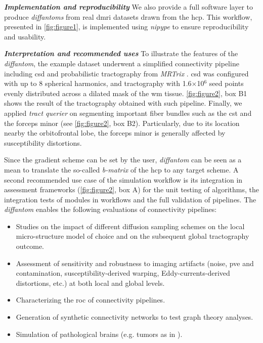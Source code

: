 \documentclass[english]{frontiers/frontiersSCNS} %
\newcommand*\glslines[2][]{\glslink[#1]{#2}{\glsdisp{#2}{\acrlong{#2} --\glsentryshort{#2}--}}}
\begin{document}
\noindent\textbf{\textit{Implementation and reproducibility\textcolon}\label{sec:data_workflow}} %
We also provide a full software layer to produce \emph{diffantoms} from real \gls*{dmri} datasets
  drawn from the \gls*{hcp}.
This workflow, presented in \autoref{fig:figure1}, is implemented using
  \emph{nipype} \citep{gorgolewski_nipype_2011} to ensure reproducibility and usability.

\noindent\textbf{\textit{Interpretation and recommended uses\textcolon}\label{sec:data_use}} %
To illustrate the features of the \emph{diffantom}, the example dataset underwent a simplified
  connectivity pipeline including \gls*{csd} and probabilistic tractography from
  \emph{MRTrix} \citep{tournier_mrtrix_2012}.
\Gls*{csd} was configured with up to 8 spherical harmonics, and tractography with 1.6$\times$10$^\text{6}$
  seed points evenly distributed across a dilated mask of the \gls*{wm} tissue.
\autoref{fig:figure2}, box B1 shows the result of the tractography obtained with such pipeline.
Finally, we applied \emph{tract querier} \citep{wassermann_on_2013} on segmenting important fiber bundles such
  as the \gls*{cst} and the forceps minor (see \autoref{fig:figure2}, box B2).
Particularly, due to its location nearby the orbitofrontal lobe, the forceps minor is generally affected by
  susceptibility distortions.

Since the gradient scheme can be set by the user, \emph{diffantom} can be seen as a mean to translate the so-called
  \emph{b-matrix} of the \gls*{hcp} to any target scheme.
A second recommended use case of the simulation workflow is its integration in assessment frameworks
  (\autoref{fig:figure2}, box A) for the unit testing of algorithms, the integration tests of
  modules in workflows and the full validation of pipelines.
The \emph{diffantom} enables the following evaluations of connectivity pipelines:
\begin{itemize}
  \item Studies on the impact of different diffusion sampling schemes on the local micro-structure
  model of choice and on the subsequent global tractography outcome.
  \item Assessment of sensitivity and robustness to imaging artifacts (noise, \acrlong{pve} and \glslines{csf} contamination,
    susceptibility-derived warping, Eddy-currents-derived distortions, etc.) at both local and global levels.
  \item Characterizing the \acrfull*{roc} of connectivity pipelines.
  \item Generation of synthetic connectivity networks to test graph theory analyses.
  \item Simulation of pathological brains (e.g. tumors as in \cite{kaus_simulation_2000}).
\end{itemize}
\end{document}

